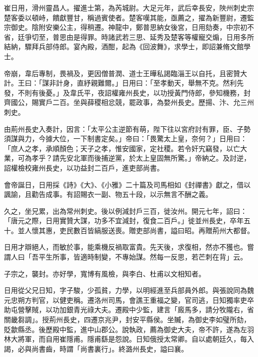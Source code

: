 \begin{pinyinscope}
 崔日用，滑州靈昌人。擢進士第，為芮城尉。大足元年，武后幸長安，陜州刺史宗楚客委以頓峙，饋獻豐甘，稱過賓使者。楚客嘆其能，亟薦之，擢為新豐尉，遷監宗御史。陰附安樂公主，得稍遷。神龍中，鄭普思納女後宮，日用劾奏，中宗初不省，廷爭切至，普思由是得罪。時諸武若三思、延秀及楚客等權寵交煽，日用多所結納，驟拜兵部侍郎。宴內殿，酒酣，起為《回波舞》，求學士，即詔兼脩文館學士。



 帝崩，韋后專制，畏禍及，更因僧普潤、道士王曄私謁臨淄王以自托，且密贊大計。王曰：「謀非計身，直紓親難爾。」日用曰：「至孝動天，舉無不克。然利先發，不則有後憂。」及韋氏平，夜詔權雍州長史，以功授黃門侍郎，參知機務，封齊國公，賜實戶二百。坐與薛稷相忿競，罷政事，為婺州長史。歷揚、汴、允三州刺史。



 由荊州長史入奏計，因言：「太平公主逆節有萌，陛下往以宮府討有罪，臣、子勢須謀與力，今據大位，一下制書定矣。」帝曰：「畏驚太上皇，奈何？」日用曰：「庶人之孝，承順顏色；天子之孝，惟安國家，定社稷。若令奸宄竊發，以亡大業，可為孝乎？請先安北軍而後捕逆黨，於太上皇固無所驚。」帝納之。及討逆，詔權檢校雍州長史，以功益封二百戶，進吏部尚書。



 會帝誕日，日用採《詩》《大》、《小雅》二十篇及司馬相如《封禪書》獻之，借以諷諭，且勸告成事。有詔賜衣一副、物五十段，以示無言不酬之義。



 久之，坐兄累，出為常州刺史。後以例減封戶三百，徙汝州。開元七年，詔曰：「唐元之際，日用實贊大謀，功多不宜減封，復食二百戶。」徙並州長史，卒年五十。並人懷其惠，吏民數百皆縞服送喪。贈吏部尚書，謚曰昭。再贈荊州大都督。



 日用才辯絕人，而敏於事，能乘機反禍取富貴。先天後，求復相，然亦不獲也。嘗謂人曰「吾平生所事，皆適時制變，不專始謀。然每一反思，若芒刺在背」云。



 子宗之，襲封。亦好學，寬博有風檢，與李白、杜甫以文相知者。



 日用從父兄日知，字子駿，少孤貧，力學，以明經進至兵部員外郎。與張說同為魏元忠朔方判官，以健吏稱。遷洛州司馬，會譙王重福之變，官司逃，日知獨率吏卒助屯營擊賊，以功加銀青光祿大夫。遷殿中少監，建言「廄馬多，請分牧隴右，省關畿芻調」。授荊州長史，四遷京兆尹，封安平縣侯。坐贓，為御史李如璧所劾，貶歙縣丞。後歷殿中監，進中山郡公。說執政，薦為御史大夫，帝不許，遂為左羽林大將軍，而自用崔隱甫。隱甫繇是怨說。日知俄授太常卿。自以處朝廷久，每入謁，必與尚書齒，時謂「尚書裏行」。終潞州長史，謚曰襄。




\end{pinyinscope}
